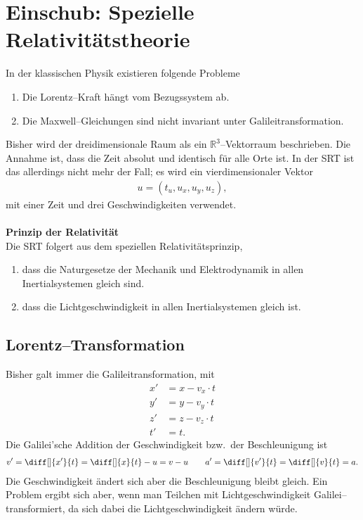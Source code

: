 \documentclass[a4paper,12pt]{article}
\begin{document}
\section{Einschub: Spezielle Relativitätstheorie}
In der klassischen Physik existieren folgende Probleme
\begin{enumerate}[label=\arabic*.]
        \item Die Lorentz--Kraft hängt vom Bezugssystem ab.
        \item Die Maxwell--Gleichungen sind nicht invariant unter Galileitransformation.
\end{enumerate}
Bisher wird der dreidimensionale Raum als ein $\mathbb{R}^3$--Vektorraum beschrieben. Die Annahme ist, dass die Zeit absolut und identisch für alle Orte ist. In der SRT ist das allerdings nicht mehr der Fall; es wird ein vierdimensionaler Vektor
\begin{align*} 
        u=\left(t_u,u_x,u_y,u_z\right)
,\end{align*} 
mit einer Zeit und drei Geschwindigkeiten verwendet.
\\\hfill\\\textbf{Prinzip der Relativität}\\
Die SRT folgert aus dem speziellen Relativitätsprinzip,
\begin{enumerate}[label=\arabic*.]
        \item dass die Naturgesetze der Mechanik und Elektrodynamik in allen Inertialsystemen gleich sind.
        \item dass die Lichtgeschwindigkeit in allen Inertialsystemen gleich ist.
\end{enumerate}

\subsection{Lorentz--Transformation}
Bisher galt immer die Galileitransformation, mit
\begin{align*} 
        x'&=x-v_x\cdot t\\
        y'&=y-v_y\cdot t\\
        z'&=z-v_z\cdot t\\
        t'&=t
.\end{align*} 
Die Galilei'sche Addition der Geschwindigkeit bzw.\ der Beschleunigung ist
\begin{align*} 
        v'=\diff[]{x'}{t}=\diff[]{x}{t}-u=v-u\qquad a'=\diff[]{v'}{t}=\diff[]{v}{t}=a
.\end{align*} 
Die Geschwindigkeit ändert sich aber die Beschleunigung bleibt gleich. Ein Problem ergibt sich aber, wenn man Teilchen mit Lichtgeschwindigkeit Galilei--transformiert, da sich dabei die Lichtgeschwindigkeit ändern würde.
\end{document}

